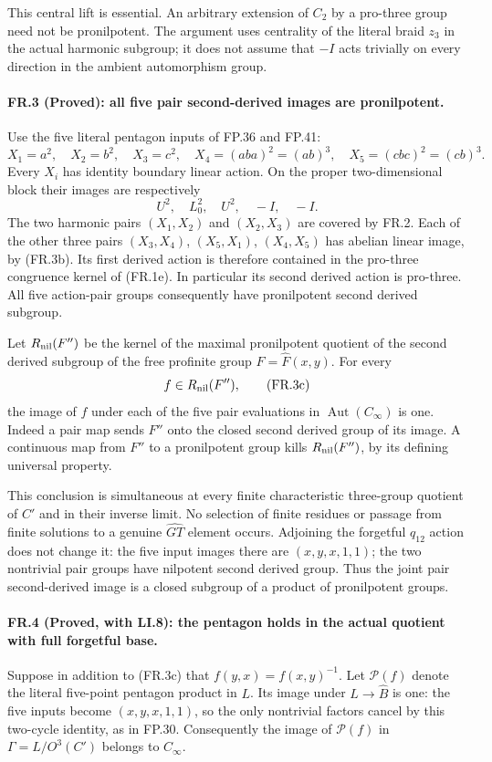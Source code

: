 This central lift is essential. An arbitrary extension of
$C_2$ by a pro-three group need not be pronilpotent. The
argument uses centrality of the literal braid $z_3$ in
the actual harmonic subgroup; it does not assume that
$-I$ acts trivially on every direction in the ambient
automorphism group.

\paragraph{FR.3 (Proved): all five pair second-derived images are pronilpotent.}
Use the five literal pentagon inputs of FP.36 and FP.41:
\[
 X_1=a^2,\quad X_2=b^2,\quad X_3=c^2,\quad
 X_4=(aba)^2=(ab)^3,\quad X_5=(cbc)^2=(cb)^3.
 \tag{FR.3a}
\]
Every $X_i$ has identity boundary linear action. On the
proper two-dimensional block their images are respectively
\[
                    U^2,\quad L_0^2,\quad U^2,\quad -I,\quad -I.
 \tag{FR.3b}
\]
The two harmonic pairs $(X_1,X_2)$ and $(X_2,X_3)$
are covered by FR.2. Each of the other three pairs
$(X_3,X_4)$, $(X_5,X_1)$, $(X_4,X_5)$ has abelian
linear image, by (FR.3b). Its first derived action is
therefore contained in the pro-three congruence kernel
of (FR.1e). In particular its second derived action
is pro-three. All five action-pair groups consequently
have pronilpotent second derived subgroup.

Let $R_{\rm nil}(F'')$ be the kernel of the maximal
pronilpotent quotient of the second derived subgroup of
the free profinite group $F=\widehat F(x,y)$. For every
\[
                         f\in R_{\rm nil}(F''),
 \tag{FR.3c}
\]
the image of $f$ under each of the five pair evaluations
in $\operatorname{Aut}(C_\infty)$ is one. Indeed a pair
map sends $F''$ onto the closed second derived group
of its image. A continuous map from $F''$ to a
pronilpotent group kills $R_{\rm nil}(F'')$, by its
defining universal property.

This conclusion is simultaneous at every finite characteristic
three-group quotient of $C'$ and in their inverse limit.
No selection of finite residues or passage from finite
solutions to a genuine $\widehat{GT}$ element occurs.
Adjoining the forgetful $q_{12}$ action does not change it:
the five input images there are $(x,y,x,1,1)$; the two
nontrivial pair groups have nilpotent second derived
group. Thus the joint pair second-derived image is a
closed subgroup of a product of pronilpotent groups.

\paragraph{FR.4 (Proved, with LI.8): the pentagon holds in the actual quotient with full forgetful base.}
Suppose in addition to (FR.3c) that
$f(y,x)=f(x,y)^{-1}$. Let $\mathcal P(f)$ denote the
literal five-point pentagon product in $L$. Its image
under $L\to\widehat B$ is one: the five inputs become
$(x,y,x,1,1)$, so the only nontrivial factors cancel
by this two-cycle identity, as in FP.30. Consequently
the image of $\mathcal P(f)$ in $\Gamma=L/O^3(C')$
belongs to $C_\infty$.

